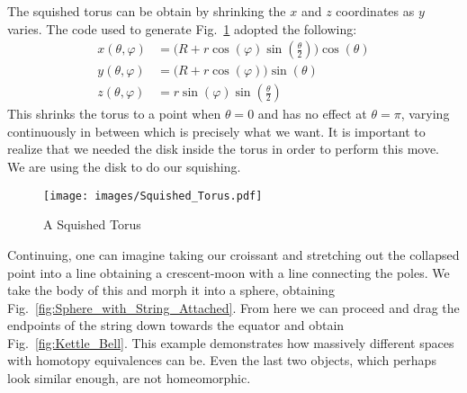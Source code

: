 \documentclass{book}                                                           %
\begin{document}
                The squished torus can be obtain by shrinking the $x$ and $z$
                coordinates as $y$ varies. The code used to generate
                Fig.~\ref{fig:Squished_Torus} adopted the following:
                \begin{subequations}
                    \begin{align}
                        x(\theta,\varphi)
                            &=\big(R+r\cos(\varphi)\sin(\tfrac{\theta}{2})\big)
                                \cos(\theta)\\
                        y(\theta,\varphi)
                            &=\big(R+r\cos(\varphi)\big)\sin(\theta)\\
                        z(\theta,\varphi)
                            &=r\sin(\varphi)\sin(\tfrac{\theta}{2})
                    \end{align}
                \end{subequations}
                This shrinks the torus to a point when $\theta=0$ and has no
                effect at $\theta=\pi$, varying continuously in between which is
                precisely what we want. It is important to realize that we
                needed the disk inside the torus in order to perform this move.
                We are using the disk to do our squishing.
                \begin{figure}[H]
                    \centering
                    \captionsetup{type=figure}
                    \texttt{[image: images/Squished\_Torus.pdf]}
                    \caption{A Squished Torus}
                    \label{fig:Squished_Torus}
                \end{figure}
                \begin{minipage}{0.50\textwidth}
                    Continuing, one can imagine taking our croissant and
                    stretching out the collapsed point into a line obtaining a
                    crescent-moon with a line connecting the poles. We take the
                    body of this and morph it into a sphere, obtaining
                    Fig.~\ref{fig:Sphere_with_String_Attached}. From here we can
                    proceed and drag the endpoints of the string down towards
                    the equator and obtain Fig.~\ref{fig:Kettle_Bell}. This
                    example demonstrates how massively different spaces with
                    homotopy equivalences can be. Even the last two objects,
                    which perhaps look similar enough, are not homeomorphic.
                \end{minipage}
\end{document}
